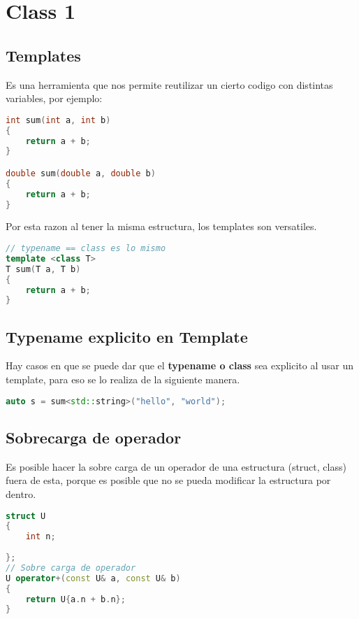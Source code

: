 \section{Class 1}
\subsection{Templates}
Es una herramienta que nos permite reutilizar un cierto codigo con distintas variables, por ejemplo:

\begin{lstlisting}[language=C++, caption={Templates 1}]
int sum(int a, int b)
{
    return a + b;
}

double sum(double a, double b)
{
    return a + b;
}
\end{lstlisting}
Por esta razon al tener la misma estructura, los templates son versatiles.
\begin{lstlisting}[language=C++, caption={Templates 2}]
// typename == class es lo mismo
template <class T>
T sum(T a, T b)
{
    return a + b;
}
\end{lstlisting}

\subsection{Typename explicito en Template}
Hay casos en que se puede dar que el \textbf{typename o class} sea explicito 
al usar un template, para eso se lo realiza de la siguiente manera.
\begin{lstlisting}[language=C++, caption={'T explicito'}]
auto s = sum<std::string>("hello", "world");
\end{lstlisting}


\subsection{Sobrecarga de operador}
Es posible hacer la sobre carga de un operador de una estructura (struct, class) fuera de esta,
porque es posible que no se pueda modificar la estructura por dentro.

\begin{lstlisting}[language=C++, caption={'Overload'}]
struct U
{
    int n;
    
};
// Sobre carga de operador
U operator+(const U& a, const U& b)
{
    return U{a.n + b.n};
}
\end{lstlisting}

